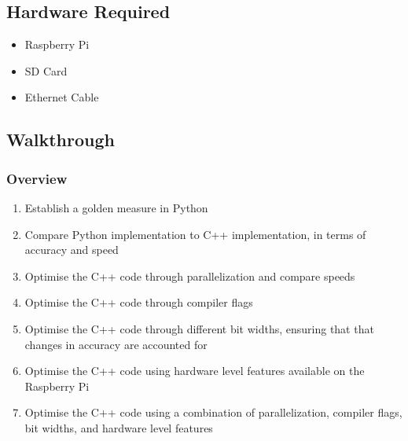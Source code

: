 \subsection{Hardware Required}
\begin{itemize}
    \item Raspberry Pi
    \item SD Card
    \item Ethernet Cable
\end{itemize}

\subsection{Walkthrough}
\subsubsection{Overview}
\begin{enumerate}
    \item Establish a golden measure in Python
    \item Compare Python implementation to C++ implementation, in terms of accuracy and speed
    \item Optimise the C++ code through parallelization and compare speeds
    \item Optimise the C++ code through compiler flags
    \item Optimise the C++ code through different bit widths, ensuring that that changes in accuracy are accounted for
    \item Optimise the C++ code using hardware level features available on the Raspberry Pi
    \item Optimise the C++ code using a combination of parallelization, compiler flags, bit widths, and hardware level features
\end{enumerate}

